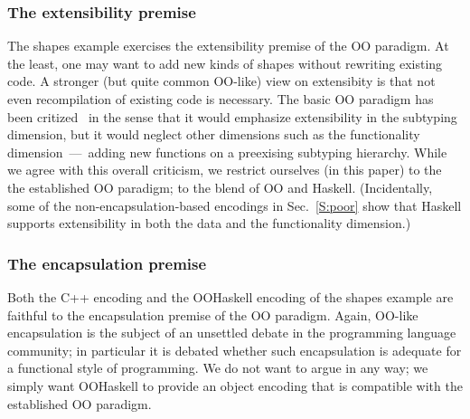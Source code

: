 \documentclass{jfp}
\begin{document}
\subsubsection{The extensibility premise}
\label{S:ext}

The shapes example exercises the extensibility premise of the OO
paradigm. At the least, one may want to add new kinds of shapes
without rewriting existing code. A stronger (but quite common OO-like)
view on extensibity is that not even recompilation of existing code is
necessary. The basic OO paradigm has been critized~\cite{ZO04} in the
sense that it would emphasize extensibility in the subtyping
dimension, but it would neglect other dimensions such as the
functionality dimension~---~adding new functions on a preexising
subtyping hierarchy. While we agree with this overall criticism, we
restrict ourselves (in this paper) to the the established OO paradigm;
to the blend of OO and Haskell. (Incidentally, some of the
non-encapsulation-based encodings in Sec.~\ref{S:poor} show that
Haskell supports extensibility in both the data and the functionality
dimension.)






\subsubsection{The encapsulation premise}

Both the C++ encoding and the OOHaskell encoding of the shapes example
are faithful to the encapsulation premise of the OO paradigm. Again,
OO-like encapsulation is the subject of an unsettled debate in the
programming language community; in particular it is debated whether
such encapsulation is adequate for a functional style of programming.
We do not want to argue in any way; we simply want OOHaskell to
provide an object encoding that is compatible with the established OO
paradigm.



\end{document}
